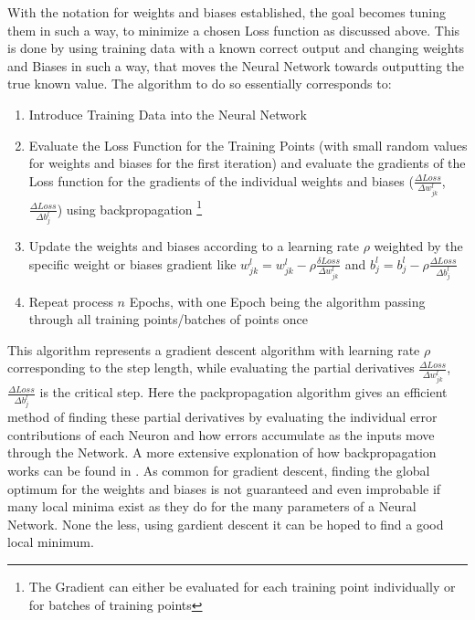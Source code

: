 With the notation for weights and biases established, the goal becomes tuning them in such a way, to minimize a chosen Loss function as discussed above. This is done by using training data with a known correct output and changing weights and Biases in such a way, that moves the Neural Network towards outputting the true known value. 
The algorithm to do so essentially corresponds to: 

\begin{enumerate}
	\item Introduce Training Data into the Neural Network
	\item Evaluate the Loss Function for the Training Points (with small random values for weights and biases for the first iteration) and evaluate the gradients of the Loss function for the gradients of the individual weights and biases ($\frac{\Delta Loss}{\Delta w_{jk}^l}$, $\frac{\Delta Loss}{\Delta b_j^l}$) using backpropagation  \footnote{The Gradient can either be evaluated for each training point individually or for batches of training points}
	\item Update the weights and biases according to a learning rate $\rho$ weighted by the specific weight or biases gradient like $w_{jk}^l =w_{jk}^l - \rho \frac{\delta Loss}{\Delta w_{jk}^l}$ and $b_j^l =b_j^l - \rho \frac{\Delta Loss}{\Delta b_j^l}$ 
	\item Repeat process $n$ Epochs, with one Epoch being the algorithm passing through all training points/batches of points once
\end{enumerate}

This algorithm represents a gradient descent algorithm with learning rate  $\rho$ corresponding to the step length, while evaluating the partial derivatives $\frac{\Delta Loss}{\Delta w_{jk}^l}$, $\frac{\Delta Loss}{\Delta b_j^l}$ is the critical step. Here the packpropagation algorithm gives an efficient method of finding these partial derivatives by evaluating the individual error contributions of each Neuron and how errors accumulate as the inputs move through the Network. A more extensive explonation of how backpropagation works can be found in \cite{nielsen2015neuralChap2}. As common for gradient descent, finding the global optimum for the weights and biases is not guaranteed and even improbable if many local minima exist as they do for the many parameters of a Neural Network. None the less, using gardient descent it can be hoped to find a good local minimum.   \cite{James2023} \cite{nielsen2015neuralChap2}

